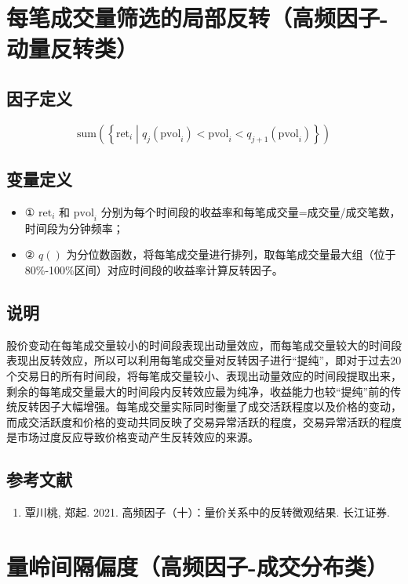 \documentclass{article}
\begin{document}
\section{每笔成交量筛选的局部反转（高频因子-动量反转类）}

\subsection{因子定义}
\begin{equation}
    \mathrm{sum}\left( \left\{ \mathrm{ret}_i \middle| q_j(\mathrm{pvol}_i) < \mathrm{pvol}_i < q_{j+1}(\mathrm{pvol}_i) \right\} \right)
\end{equation}

\subsection{变量定义}
\begin{itemize}
    \item ① \(\mathrm{ret}_i\) 和 \(\mathrm{pvol}_i\) 分别为每个时间段的收益率和每笔成交量=成交量/成交笔数，时间段为分钟频率；
    \item ② \(q()\) 为分位数函数，将每笔成交量进行排列，取每笔成交量最大组（位于80\%-100\%区间）对应时间段的收益率计算反转因子。
\end{itemize}

\subsection{说明}
股价变动在每笔成交量较小的时间段表现出动量效应，而每笔成交量较大的时间段表现出反转效应，所以可以利用每笔成交量对反转因子进行“提纯”，即对于过去20个交易日的所有时间段，将每笔成交量较小、表现出动量效应的时间段提取出来，剩余的每笔成交量最大的时间段内反转效应最为纯净，收益能力也较“提纯”前的传统反转因子大幅增强。每笔成交量实际同时衡量了成交活跃程度以及价格的变动，而成交活跃度和价格的变动共同反映了交易异常活跃的程度，交易异常活跃的程度是市场过度反应导致价格变动产生反转效应的来源。

\subsection{参考文献}
\begin{enumerate}
    \item 覃川桃, 郑起. 2021. 高频因子（十）：量价关系中的反转微观结果. 长江证券.
\end{enumerate}

\section{量岭间隔偏度（高频因子-成交分布类）}
\end{document}
